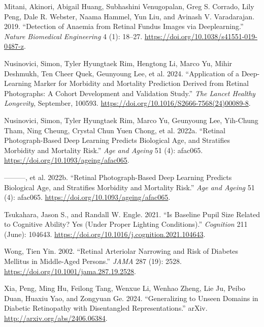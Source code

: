 \documentclass[
  Letterpaper,
]{scrbook}
\newlength{\cslhangindent}
\newenvironment{CSLReferences}[2] %
 {\begin{list}{}{%
  \setlength{\itemindent}{0pt}
  \setlength{\leftmargin}{0pt}
  \setlength{\parsep}{0pt}
  \ifodd #1
   \setlength{\leftmargin}{\cslhangindent}
   \setlength{\itemindent}{-1\cslhangindent}
  \fi
  \setlength{\itemsep}{#2\baselineskip}}}
 {\end{list}}
\begin{document}
\begin{CSLReferences}{1}{0}
Mitani, Akinori, Abigail Huang, Subhashini Venugopalan, Greg S. Corrado,
Lily Peng, Dale R. Webster, Naama Hammel, Yun Liu, and Avinash V.
Varadarajan. 2019. {``Detection of Anaemia from Retinal Fundus Images
via Deeplearning.''} \emph{Nature Biomedical Engineering} 4 (1): 18--27.
\url{https://doi.org/10.1038/s41551-019-0487-z}.

Nusinovici, Simon, Tyler Hyungtaek Rim, Hengtong Li, Marco Yu, Mihir
Deshmukh, Ten Cheer Quek, Geunyoung Lee, et al. 2024. {``Application of
a Deep-Learning Marker for Morbidity and Mortality Prediction Derived
from Retinal Photographs: A Cohort Development and Validation Study.''}
\emph{The Lancet Healthy Longevity}, September, 100593.
\url{https://doi.org/10.1016/S2666-7568(24)00089-8}.

Nusinovici, Simon, Tyler Hyungtaek Rim, Marco Yu, Geunyoung Lee,
Yih-Chung Tham, Ning Cheung, Crystal Chun Yuen Chong, et al. 2022a.
{``Retinal Photograph-Based Deep Learning Predicts Biological Age, and
Stratifies Morbidity and Mortality Risk.''} \emph{Age and Ageing} 51
(4): afac065. \url{https://doi.org/10.1093/ageing/afac065}.

---------, et al. 2022b. {``Retinal Photograph-Based Deep Learning
Predicts Biological Age, and Stratifies Morbidity and Mortality Risk.''}
\emph{Age and Ageing} 51 (4): afac065.
\url{https://doi.org/10.1093/ageing/afac065}.

Tsukahara, Jason S., and Randall W. Engle. 2021. {``Is Baseline Pupil
Size Related to Cognitive Ability? {Yes} (Under Proper Lighting
Conditions).''} \emph{Cognition} 211 (June): 104643.
\url{https://doi.org/10.1016/j.cognition.2021.104643}.

Wong, Tien Yin. 2002. {``Retinal {Arteriolar} {Narrowing} and {Risk} of
{Diabetes} {Mellitus} in {Middle}-Aged {Persons}.''} \emph{JAMA} 287
(19): 2528. \url{https://doi.org/10.1001/jama.287.19.2528}.

Xia, Peng, Ming Hu, Feilong Tang, Wenxue Li, Wenhao Zheng, Lie Ju, Peibo
Duan, Huaxiu Yao, and Zongyuan Ge. 2024. {``Generalizing to {Unseen}
{Domains} in {Diabetic} {Retinopathy} with {Disentangled}
{Representations}.''} arXiv. \url{http://arxiv.org/abs/2406.06384}.


\end{CSLReferences}
\end{document}
